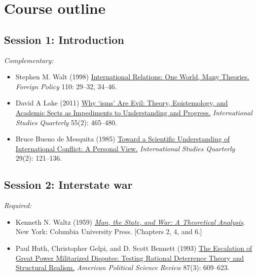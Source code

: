 \documentclass[12pt, a4paper]{article}
\begin{document}
\newpage
\section{Course outline}


\subsection*{Session 1: Introduction}

\noindent\textit{Complementary:}

\begin{itemize}
  \item Stephen M. Walt (1998) \href{https://doi.org/10.2307/1149275}{International Relations: One World, Many Theories.} \textit{Foreign Policy} 110: 29--32, 34--46.
  \item David A Lake (2011) \href{https://doi.org/10.1111/j.1468-2478.2011.00661.x}{Why `isms' Are Evil: Theory, Epistemology, and Academic Sects as Impediments to Understanding and Progress.} \textit{International Studies Quarterly} 55(2): 465--480.
  \item Bruce Bueno de Mesquita (1985) \href{https://doi.org/10.2307/2600500}{Toward a Scientific Understanding of International Conflict: A Personal View.} \textit{International Studies Quarterly} 29(2): 121--136.
\end{itemize}


\vspace{20pt}
\hline
\subsection*{Session 2: Interstate war}

\noindent\textit{Required:}

\begin{itemize}
  \item Kenneth N. Waltz (1959) \href{https://cup.columbia.edu/book/man-the-state-and-war/9780231188043}{\textit{Man, the State, and War: A Theoretical Analysis}}. New York: Columbia University Press. [Chapters 2, 4, and 6.]
  \item Paul Huth, Christopher Gelpi, and D. Scott Bennett (1993) \href{https://doi.org/10.2307/2938739}{The Escalation of Great Power Militarized Disputes: Testing Rational Deterrence Theory and Structural Realism.} \textit{American Political Science Review} 87(3): 609--623.
\end{itemize}
\end{document}
